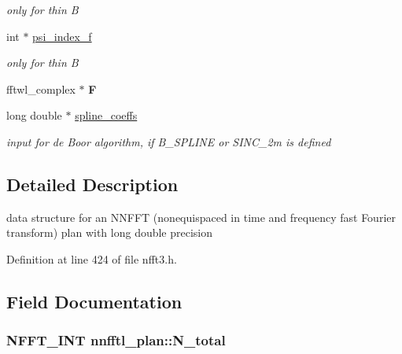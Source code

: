 \begin{DoxyCompactItemize}
\begin{DoxyCompactList}\small\item\em only for thin B \end{DoxyCompactList}\item 
\hypertarget{structnnfftl__plan_abf4204a1a31afd35d490ca4ef42bd596}{int $\ast$ \hyperlink{structnnfftl__plan_abf4204a1a31afd35d490ca4ef42bd596}{psi\-\_\-index\-\_\-f}}\label{structnnfftl__plan_abf4204a1a31afd35d490ca4ef42bd596}

\begin{DoxyCompactList}\small\item\em only for thin B \end{DoxyCompactList}\item 
\hypertarget{structnnfftl__plan_a5ab9f4d21b6828336f3eb8b92910f9b3}{fftwl\-\_\-complex $\ast$ {\bfseries F}}\label{structnnfftl__plan_a5ab9f4d21b6828336f3eb8b92910f9b3}

\item 
\hypertarget{structnnfftl__plan_a8f364097c04b46c203a4883af90b9eb0}{long double $\ast$ \hyperlink{structnnfftl__plan_a8f364097c04b46c203a4883af90b9eb0}{spline\-\_\-coeffs}}\label{structnnfftl__plan_a8f364097c04b46c203a4883af90b9eb0}

\begin{DoxyCompactList}\small\item\em input for de Boor algorithm, if B\-\_\-\-S\-P\-L\-I\-N\-E or S\-I\-N\-C\-\_\-2m is defined \end{DoxyCompactList}\end{DoxyCompactItemize}


\subsection{Detailed Description}
data structure for an N\-N\-F\-F\-T (nonequispaced in time and frequency fast Fourier transform) plan with long double precision 

Definition at line 424 of file nfft3.\-h.



\subsection{Field Documentation}
\hypertarget{structnnfftl__plan_af772842479519af7bfb47dcfd28ae6ff}{
\subsubsection[{N\-\_\-total}]{\setlength{\rightskip}{0pt plus 5cm}N\-F\-F\-T\-\_\-\-I\-N\-T nnfftl\-\_\-plan\-::\-N\-\_\-total}}\label{structnnfftl__plan_af772842479519af7bfb47dcfd28ae6ff}


